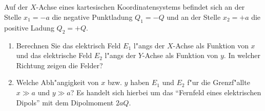 \documentclass[twoside,colorbacktitle,accentcolor=tud0b]{tudexercise}
\begin{document}
  \subsection{}
    Auf der $X$-Achse eines kartesischen Koordinatensystems befindet sich an der Stelle $x_1=-a$
    die negative Punktladung $Q_1=-Q$ und an der Stelle $x_2=+a$ die positive Ladung $Q_2=+Q$.
    \begin{enumerate}
      \item Berechnen Sie das elektrisch Feld $E_1$ l"angs der $X$-Achse als Funktion von $x$ und
      das elektrische Feld $E_2$ l"angs der $Y$-Achse als Funktion von $y$. In welcher Richtung
      zeigen die Felder?
      \item Welche Abh"angigkeit von $x$ bzw. $y$ haben $E_1$ und $E_2$ f"ur die Grenzf"allte
      $x\gg a$ und $y\gg a$? Es handelt sich hierbei um das "`Fernfeld eines elektrischen Dipols"'
      mit dem Dipolmoment $2aQ$.
    \end{enumerate}
\end{document}
